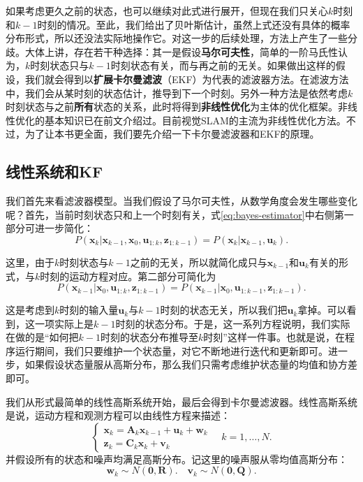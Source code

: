如果考虑更久之前的状态，也可以继续对此式进行展开，但现在我们只关心$k$时刻和$k-1$时刻的情况。至此，我们给出了贝叶斯估计，虽然上式还没有具体的概率分布形式，所以还没法实际地操作它。对这一步的后续处理，方法上产生了一些分歧。大体上讲，存在若干种选择：其一是假设\textbf{马尔可夫性}，简单的一阶马氏性认为，$k$时刻状态只与$k-1$时刻状态有关，而与再之前的无关。如果做出这样的假设，我们就会得到以\textbf{扩展卡尔曼滤波}（EKF）为代表的滤波器方法。在滤波方法中，我们会从某时刻的状态估计，推导到下一个时刻。另外一种方法是依然考虑$k$时刻状态与之前\textbf{所有}状态的关系，此时将得到\textbf{非线性优化}为主体的优化框架。非线性优化的基本知识已在前文介绍过。目前视觉SLAM的主流为非线性优化方法。不过，为了让本书更全面，我们要先介绍一下卡尔曼滤波器和EKF的原理。

\subsection{线性系统和KF}
我们首先来看滤波器模型。当我们假设了马尔可夫性，从数学角度会发生哪些变化呢？首先，当前时刻状态只和上一个时刻有关，式\eqref{eq:bayes-estimator}中右侧第一部分可进一步简化：
\begin{equation}
P\left( {{\bm{x}_k}|{\bm{x}_{k - 1}},{\bm{x}_0},{\bm{u}_{1:k}},{\bm{z}_{1:k - 1}}} \right) = P\left( {{\bm{x}_k}|{\bm{x}_{k - 1}},{\bm{u}_k}} \right).
\end{equation}

这里，由于$k$时刻状态与$k-1$之前的无关，所以就简化成只与$\bm{x}_{k-1}$和$\bm{u}_k$有关的形式，与${k}$时刻的运动方程对应。第二部分可简化为
\begin{equation}
P\left( {{\bm{x}_{k - 1}}|{\bm{x}_0},{\bm{u}_{1:k}},{\bm{z}_{1:k - 1}}} \right) = P\left( {{\bm{x}_{k - 1}}|{\bm{x}_0},{\bm{u}_{1:k - 1}},{\bm{z}_{1:k - 1}}} \right).
\end{equation}

这是考虑到$k$时刻的输入量$\bm{u}_k$与$k-1$时刻的状态无关，所以我们把$\bm{u}_k$拿掉。可以看到，这一项实际上是$k-1$时刻的状态分布。于是，这一系列方程说明，我们实际在做的是“如何把$k-1$时刻的状态分布推导至$k$时刻”这样一件事。也就是说，在程序运行期间，我们只要维护一个状态量，对它不断地进行迭代和更新即可。进一步，如果假设状态量服从高斯分布，那么我们只需考虑维护状态量的均值和协方差即可。

我们从形式最简单的线性高斯系统开始，最后会得到卡尔曼滤波器。线性高斯系统是说，运动方程和观测方程可以由线性方程来描述：
\begin{equation}
\left\{ \begin{array}{l}
{\bm{x}_k} = \bm{A}_k {{\bm{x}_{k - 1}}+{\bm{u}_k}} + \bm{w}_k \\
{\bm{z}_{k}} = \bm{C}_k  { \bm{x}_k} + \bm{v}_{k} \end{array} \right. \quad k=1, \ldots, N .
\end{equation}
并假设所有的状态和噪声均满足高斯分布。记这里的噪声服从零均值高斯分布：
\begin{equation}
\bm{w}_k \sim N(\bm{0}, \bm{R}). \quad \bm{v}_k \sim N( \bm{0}, \bm{Q}).
\end{equation}

